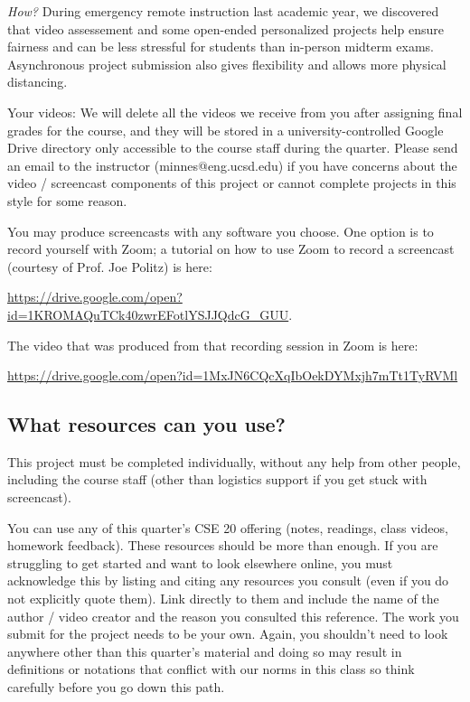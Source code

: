 {\it How?} During emergency remote instruction last academic year, we discovered
that video assessement and some open-ended personalized projects help ensure fairness
and can be less stressful for students than in-person midterm exams. Asynchronous project
submission also gives flexibility and allows more physical distancing.

Your videos: We will delete all the videos we receive from you after assigning final grades for the course, 
and they will be stored in a university-controlled Google Drive directory 
only accessible to the course staff during the quarter. 
Please send an email to the instructor (minnes@eng.ucsd.edu) if you have 
concerns about 
the video / screencast components of this project or cannot complete projects in this style for some reason.

You may produce screencasts with any software you choose. 
One option is to record yourself with Zoom; a tutorial on how to use Zoom to record a 
screencast (courtesy of Prof. Joe Politz)  is here: 

\url{https://drive.google.com/open?id=1KROMAQuTCk40zwrEFotlYSJJQdcG_GUU}.

The video that was produced from that recording session in Zoom is here:

\url{https://drive.google.com/open?id=1MxJN6CQcXqIbOekDYMxjh7mTt1TyRVMl}

\subsection*{What resources can you use?}
This project must be completed individually, without any help from other people, 
including the course staff (other than logistics support if you get stuck with screencast). 

You can use any of this quarter's CSE 20 offering (notes, readings, class videos, homework feedback). 
These resources should be more than enough. If you are struggling to get started and want to 
look elsewhere online, you must acknowledge this by listing and citing any resources you consult 
(even if you do not explicitly quote them). Link directly to them and include the name of the 
author / video creator and the reason you consulted this reference. The work you submit for 
the project needs to be your own. Again, you shouldn't need to look anywhere other 
than this quarter's material and doing so may result in definitions or notations 
that conflict with our norms in this class so think carefully before you go down this path.

